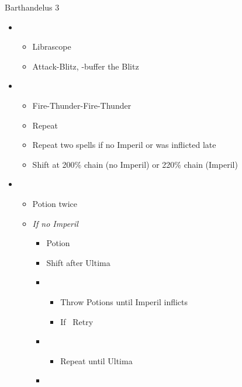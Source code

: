 \begin{battle}[1:24]{Barthandelus 3}
  \begin{multicols}{2}
    \begin{itemize}
      \item \second
            \begin{itemize}
              \item Librascope
              \item Attack-Blitz, \rav-buffer the Blitz
            \end{itemize}
      \item \fifth
            \begin{itemize}
              \item Fire-Thunder-Fire-Thunder
              \item Repeat
              \item Repeat two spells if no Imperil or was inflicted late
              \item Shift at 200\% chain (no Imperil) or 220\% chain (Imperil)
            \end{itemize}
      \item \third
            \begin{itemize}
              \item Potion twice
              \item \textit{If no Imperil}
                    \begin{itemize}
                      \item Potion
                      \item Shift after Ultima
                      \item \fifth
                            \begin{itemize}
                              \item Throw Potions until Imperil inflicts
                              \item If \stagger\ Retry
                            \end{itemize}
                      \item \first
                            \begin{itemize}
                              \item Repeat until Ultima
                            \end{itemize}
                      \item \third
                            \begin{itemize}

\end{itemize}
\end{itemize}
\end{itemize}
\end{itemize}
\end{multicols}
\end{battle}
